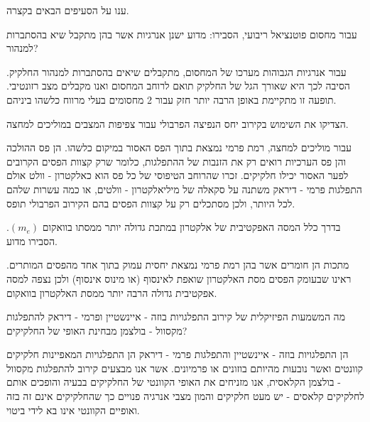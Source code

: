 \documentclass{article}
\begin{document}
\begin{Question}%
ענו על הסעיפים הבאים בקצרה.\\
\begin{SubQuestion}
עבור מחסום פוטנציאל ריבועי, הסבירו: מדוע ישנן אנרגיות אשר בהן מתקבל שיא בהסתברות למנהור?
\end{SubQuestion}
\begin{SubAnswer}
עבור אנרגיות הגבוהות מערכו של המחסום, מתקבלים שיאים בהסתברות למנהור החלקיק. הסיבה לכך היא שאורך הגל של החלקיק תואם לרוחב המחסום ואנו מקבלים מצב רזונטיבי. תופעה זו מתקיימת באופן הרבה יותר חזק עבור 2 מחסומים בעלי מרווח כלשהו ביניהם.
\end{SubAnswer}
\begin{SubQuestion}
הצדיקו את השימוש בקירוב יחס הנפיצה הפרבולי עבור צפיפות המצבים במוליכים למחצה.
\end{SubQuestion}
\begin{SubAnswer}
עבור מוליכים למחצה, רמת פרמי נמצאת בתוך הפס האסור במיקום כלשהו. הן פס ההולכה והן פס הערכיות רואים רק את הזנבות של ההתפלגות, כלומר שרק קצוות הפסים הקרובים לפער האסור יכילו חלקיקים. זכרו שהרוחב הטיפוסי של כל פס הוא כאלקטרון - וולט אולם התפלגות פרמי - דיראק משתנה על סקאלה של מיליאלקטרון - וולטים, או כמה עשרות שלהם לכל היותר, ולכן מסתכלים רק על קצוות הפסים בהם הקירוב הפרבולי תופס.
\end{SubAnswer}
\begin{SubQuestion}
בדרך כלל המסה האפקטיבית של אלקטרון במתכת גדולה יותר ממסתו בוואקום $(m_{e})$. הסבירו מדוע.
\end{SubQuestion}
\begin{SubAnswer}
מתכות הן חומרים אשר בהן רמת פרמי נמצאת יחסית עמוק בתוך אחד מהפסים המותרים. ראינו שבעומק הפסים מסת האלקטרון שואפת לאינסוף (או מינוס אינסוף) ולכן נצפה למסה אפקטיבית גדולה הרבה יותר ממסת האלקטרון בוואקום.
\end{SubAnswer}
\begin{SubQuestion}
    מה המשמעות הפיזיקלית של קירוב התפלגויות בוזה - איינשטיין ופרמי - דיראק להתפלגות מקסוול - בולצמן מבחינת האופי של החלקיקים?
\end{SubQuestion}
\begin{SubAnswer}
    הן התפלגויות בוזה - איינשטיין והתפלגות פרמי - דיראק הן התפלגויות המאפיינות חלקיקים קוונטים ואשר נובעות מהיותם בוזונים או פרמיונים. אשר אנו מבצעים קירוב להתפלגות מקסוול - בולצמן הקלאסית, אנו מזניחים את האופי הקוונטי של החלקיקים בבעיה והופכים אותם לחלקיקים קלאסים - יש מעט חלקיקים והמון מצבי אנרגיה פנויים כך שהחלקיקים אינם זה בזה ואופיים הקוונטי אינו בא לידי ביטוי.
\end{SubAnswer}

\end{Question}
\end{document}
